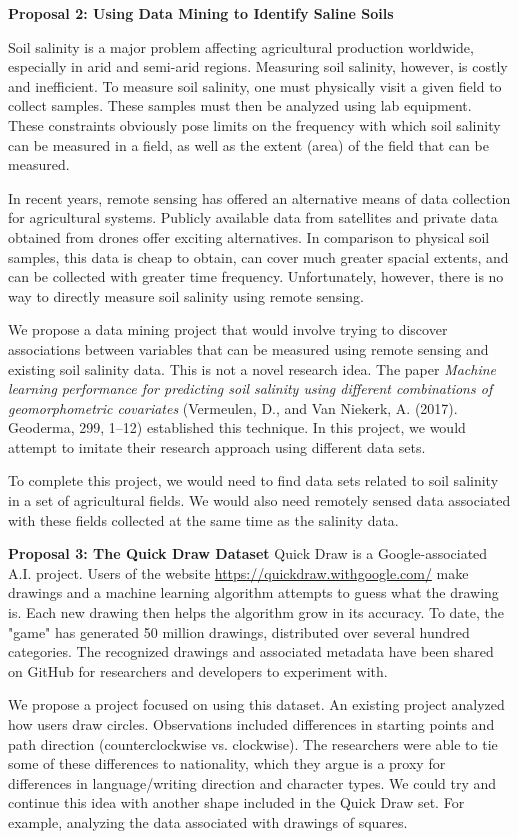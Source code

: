 \documentclass[11pt]{article}
\begin{document}
  \textbf{Proposal 2: Using Data Mining to Identify Saline Soils}

  Soil salinity is a major problem affecting agricultural production worldwide, especially in arid and semi-arid regions. Measuring soil salinity, however, is costly and inefficient. To measure soil salinity, one must physically visit a given field to collect samples. These samples must then be analyzed using lab equipment. These constraints obviously pose limits on the frequency with which soil salinity can be measured in a field, as well as the extent (area) of the field that can be measured.

  In recent years, remote sensing has offered an alternative means of data collection for agricultural systems. Publicly available data from satellites and private data obtained from drones offer exciting alternatives. In comparison to physical soil samples, this data is cheap to obtain, can cover much greater spacial extents, and can be collected with greater time frequency. Unfortunately, however, there is no way to directly measure soil salinity using remote sensing.

  We propose a data mining project that would involve trying to discover associations between variables that can be measured using remote sensing and existing soil salinity data. This is not a novel research idea. The paper \textit{Machine learning performance for predicting soil salinity using different combinations of geomorphometric covariates} (Vermeulen, D., and Van Niekerk, A. (2017). Geoderma, 299, 1–12) established this technique. In this project, we would attempt to imitate their research approach using different data sets.

  To complete this project, we would need to find data sets related to soil salinity in a set of agricultural fields. We would also need remotely sensed data associated with these fields collected at the same time as the salinity data.

  \textbf{Proposal 3: The Quick Draw Dataset}
  Quick Draw is a Google-associated A.I. project. Users of the website \url{https://quickdraw.withgoogle.com/} make drawings and a machine learning algorithm attempts to guess what the drawing is. Each new drawing then helps the algorithm grow in its accuracy. To date, the "game" has generated 50 million drawings, distributed over several hundred categories. The recognized drawings and associated metadata have been shared on GitHub for researchers and developers to experiment with.

  We propose a project focused on using this dataset. An existing project analyzed how users draw circles. Observations included differences in starting points and path direction (counterclockwise vs. clockwise). The researchers were able to tie some of these differences to nationality, which they argue is a proxy for differences in language/writing direction and character types. We could try and continue this idea with another shape included in the Quick Draw set. For example, analyzing the data associated with drawings of squares.
\end{document}
